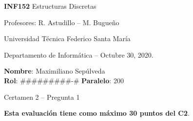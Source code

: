 \documentclass[letterpaper,10pt]{article}
\begin{document}
\thispagestyle{empty}

\begin{minipage}[t]{0.6\textwidth}

{\LARGE \textbf{INF152} Estructuras Discretas}

{\large Profesores: R. Astudillo -- M. Bugueño}

Universidad Técnica Federico Santa María

Departamento de Informática -- Octubre 30, 2020.

\end{minipage}
\hfill
\begin{minipage}[t]{0.35\textwidth}
\textbf{Nombre}: Maximiliano Sepúlveda \\[0.3cm]
\textbf{Rol}: #########-# \textbf{Paralelo}: 200
\end{minipage}

\vspace{0.8cm}

{\Large Certamen 2 -- Pregunta 1}

\vspace{0.4cm}

\textbf{Esta evaluación tiene como máximo 30 puntos del C2}.
\end{document}
